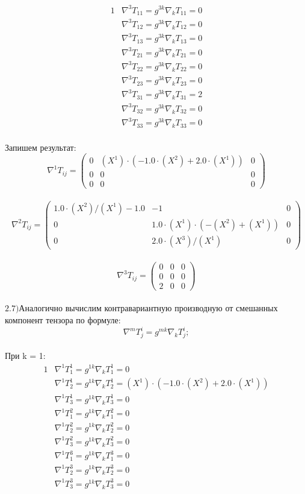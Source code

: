 \documentclass[a4paper, 12pt, oneside]{article}
\begin{document}
\begin{alignat*}{1}
  & \nabla^3T_{11} = g^{3k}\nabla_kT_{11} = 0 \\
  & \nabla^3T_{12} = g^{3k}\nabla_kT_{12} = 0 \\
  & \nabla^3T_{13} = g^{3k}\nabla_kT_{13} = 0 \\
  & \nabla^3T_{21} = g^{3k}\nabla_kT_{21} = 0 \\
  & \nabla^3T_{22} = g^{3k}\nabla_kT_{22} = 0 \\
  & \nabla^3T_{23} = g^{3k}\nabla_kT_{23} = 0 \\
  & \nabla^3T_{31} = g^{3k}\nabla_kT_{31} = 2 \\
  & \nabla^3T_{32} = g^{3k}\nabla_kT_{32} = 0 \\
  & \nabla^3T_{33} = g^{3k}\nabla_kT_{33} = 0 
\end{alignat*}\\
Запишем результат:\\
\[
\nabla^1T_{ij} = \begin{pmatrix}
	0 & (X^1)\cdot (-1.0\cdot (X^2) + 2.0\cdot (X^1)) & 0\\
	0 & 0 & 0\\
	0 & 0 & 0
\end{pmatrix}
\]\\
\[
\nabla^2T_{ij} = \begin{pmatrix}
	1.0\cdot (X^2)/(X^1) - 1.0 & -1 & 0\\
	0 & 1.0\cdot (X^1)\cdot (-(X^2) + (X^1)) & 0\\
	0 & 2.0\cdot (X^3)/(X^1) & 0
\end{pmatrix}
\]\\
\[
\nabla^3T_{ij} = \begin{pmatrix}
	0 & 0 & 0\\
	0 & 0 & 0\\
	2 & 0 & 0
\end{pmatrix}
\]\\
$\mathrm{2.7) }$Аналогично вычислим контравариантную производную от смешанных компонент тензора по формуле:\\
\[
\nabla^mT^i_j = g^{mk}\nabla_kT^i_j;
\]\\
При k = 1:\\
\begin{alignat*}{1}
  & \nabla^1T^1_1 = g^{1k}\nabla_kT^1_1 = 0 \\
  & \nabla^1T^1_2 = g^{1k}\nabla_kT^1_2 = (X^1)\cdot (-1.0\cdot (X^2) + 2.0\cdot (X^1)) \\
  & \nabla^1T^1_3 = g^{1k}\nabla_kT^1_3 = 0 \\
  & \nabla^1T^2_1 = g^{1k}\nabla_kT^2_1 = 0 \\
  & \nabla^1T^2_2 = g^{1k}\nabla_kT^2_2 = 0 \\
  & \nabla^1T^2_3 = g^{1k}\nabla_kT^2_3 = 0 \\
  & \nabla^1T^3_1 = g^{1k}\nabla_kT^3_1 = 0 \\
  & \nabla^1T^3_2 = g^{1k}\nabla_kT^3_2 = 0 \\
  & \nabla^1T^3_3 = g^{1k}\nabla_kT^3_3 = 0 
\end{alignat*}\\
\end{document}
